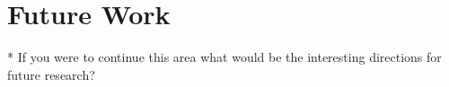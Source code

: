 \section{Future Work}
* If you were to continue this area what would be the interesting directions for future research?